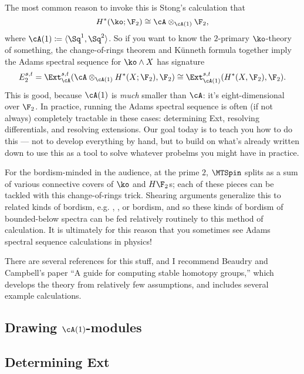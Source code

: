 The most common reason to invoke this is Stong's calculation that
\begin{equation}
	H^*(\ko;\F_2) \cong \cA\otimes_{\cA(1)} \F_2,
\end{equation}
where $\cA(1) \coloneqq \ang{\Sq^1, \Sq^2}$. So if you want to know the $2$-primary $\ko$-theory of something, the
change-of-rings theorem and Künneth formula together imply the Adams spectral sequence for $\ko\wedge X$ has
signature
\begin{equation}
	E_2^{s,t} = \Ext_\cA^{s,t}(\cA\otimes_{\cA(1)} H^*(X;\F_2), \F_2) \cong \Ext_{\cA(1)}^{s,t}(H^*(X,\F_2), \F_2).
\end{equation}
This is good, because $\cA(1)$ is \emph{much} smaller than $\cA$: it's eight-dimensional over $\F_2$. In practice,
running the Adams spectral sequence is often (if not always) completely tractable in these cases: determining Ext,
resolving differentials, and resolving extensions. Our goal today is to teach you how to do this --- not to
develop everything by hand, but to build on what's already written down to use this as a tool to solve whatever
probelms you might have in practice.
\begin{rem}
For the bordism-minded in the audience, at the prime $2$, $\MTSpin$ splits as a sum of various connective covers of
$\ko$ and $H\F_2$s; each of these pieces can be tackled with this change-of-rings trick. Shearing arguments
generalize this to related kinds of bordism, e.g. \spinc, \pinp, or \pinm bordism, and so these kinds of bordism of
bounded-below spectra can be fed relatively routinely to this method of calculation. It is ultimately for this
reason that you sometimes see Adams spectral sequence calculations in physics!
\end{rem}
There are several references for this stuff, and I recommend Beaudry and Campbell's paper ``A guide for computing
stable homotopy groups,'' which develops the theory from relatively few assumptions, and includes several example
calculations.

\subsection{Drawing $\cA(1)$-modules}



\subsection{Determining Ext}


